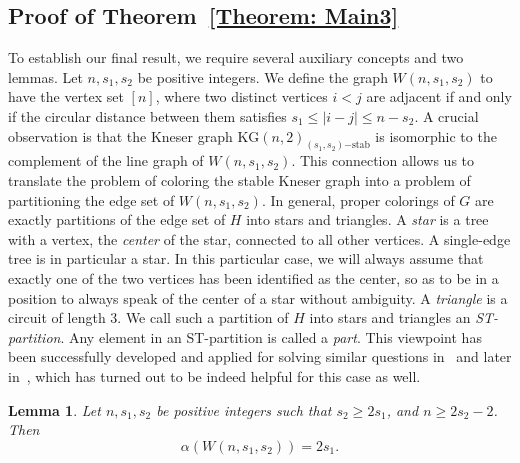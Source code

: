 \documentclass[preprint,12pt,3p]{elsarticle}
\newtheorem{lemma}[theorem]{Lemma}
\begin{document}
\subsection{Proof of Theorem~\ref{Theorem: Main3}}
To establish our final result, we require several auxiliary concepts and two lemmas. Let $n, s_1, s_2$ be positive integers. We define the graph $W(n, s_1, s_2)$ to have the vertex set $[n]$, where two distinct vertices $i < j$ are adjacent if and only if the circular distance between them satisfies $s_1 \leq |i - j| \leq n - s_2$. A crucial observation is that the Kneser graph $\mathrm{KG}(n,2)_{(s_1,s_2)\mathrm{-stab}}$ is isomorphic to the complement of the line graph of $W(n, s_1, s_2)$. This connection allows us to translate the problem of coloring the stable Kneser graph into a problem of partitioning the edge set of $W(n, s_1, s_2)$. In general, proper colorings of $G$ are exactly partitions of the edge set of $H$ into stars and triangles. A {\em star} is a tree with a vertex, the {\em center} of the star, connected to all other vertices. A single-edge tree is in particular a star. In this particular case, we will always assume that exactly one of the two vertices has been identified as the center, so as to be in a position to always speak of the center of a star without ambiguity. A {\em triangle} is a circuit of length $3$. We call such a partition of $H$ into stars and triangles an {\em ST-partition}. Any element in an ST-partition is called a {\em part}. This viewpoint has been successfully developed and applied for solving similar questions in~\cite{daneshpajouh2021colorings} and later in~\cite{daneshpajouh2024number}, which has turned out to be indeed helpful for this case as well.
   
\begin{lemma}
Let $n, s_1, s_2$ be positive integers such that $s_2 \geq 2s_1$, and $n \geq 2s_2 - 2$. Then
\[
\alpha(W(n, s_1, s_2)) = 2s_1.
\]
\end{lemma}
\end{document}
